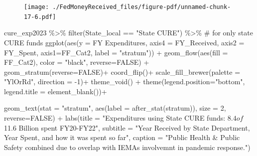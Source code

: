 \documentclass[
  letterpaper,
  DIV=11,
  numbers=noendperiod]{scrreport}
\newenvironment{Shaded}{\begin{snugshade}}{\end{snugshade}}
\newcommand{\AttributeTok}[1]{\textcolor[rgb]{0.40,0.45,0.13}{#1}}
\newcommand{\CommentTok}[1]{\textcolor[rgb]{0.37,0.37,0.37}{#1}}
\newcommand{\ConstantTok}[1]{\textcolor[rgb]{0.56,0.35,0.01}{#1}}
\newcommand{\DecValTok}[1]{\textcolor[rgb]{0.68,0.00,0.00}{#1}}
\newcommand{\FunctionTok}[1]{\textcolor[rgb]{0.28,0.35,0.67}{#1}}
\newcommand{\NormalTok}[1]{\textcolor[rgb]{0.00,0.23,0.31}{#1}}
\newcommand{\SpecialCharTok}[1]{\textcolor[rgb]{0.37,0.37,0.37}{#1}}
\newcommand{\StringTok}[1]{\textcolor[rgb]{0.13,0.47,0.30}{#1}}
\begin{document}
\begin{figure}[H]

{\centering \texttt{[image: ./FedMoneyReceived\_files/figure-pdf/unnamed-chunk-17-6.pdf]}

}

\end{figure}

\begin{Shaded}
\begin{Highlighting}[]
\NormalTok{cure\_exp2023 }\SpecialCharTok{\%\textgreater{}\%} 
  \FunctionTok{filter}\NormalTok{(State\_local }\SpecialCharTok{==} \StringTok{"State CURE"}\NormalTok{) }\SpecialCharTok{\%\textgreater{}\%} \CommentTok{\# for only state CURE funds}
  \FunctionTok{ggplot}\NormalTok{(}\FunctionTok{aes}\NormalTok{(}\AttributeTok{y =} \StringTok{\textasciigrave{}}\AttributeTok{FY Expenditures}\StringTok{\textasciigrave{}}\NormalTok{, }\AttributeTok{axis4 =}\NormalTok{ FY\_Received,  }
             \AttributeTok{axis2 =}\NormalTok{ FY\_Spent, }\AttributeTok{axis1=}\NormalTok{FF\_Cat2, }\AttributeTok{label =} \StringTok{"stratum"}\NormalTok{)) }\SpecialCharTok{+}
  \FunctionTok{geom\_flow}\NormalTok{(}\FunctionTok{aes}\NormalTok{(}\AttributeTok{fill =}\NormalTok{ FF\_Cat2), }\AttributeTok{color =} \StringTok{"black"}\NormalTok{, }\AttributeTok{reverse=}\ConstantTok{FALSE}\NormalTok{) }\SpecialCharTok{+}
  \FunctionTok{geom\_stratum}\NormalTok{(}\AttributeTok{reverse=}\ConstantTok{FALSE}\NormalTok{)}\SpecialCharTok{+}
  \FunctionTok{coord\_flip}\NormalTok{()}\SpecialCharTok{+}
  \FunctionTok{scale\_fill\_brewer}\NormalTok{(}\AttributeTok{palette =} \StringTok{"YlOrRd"}\NormalTok{, }\AttributeTok{direction =} \SpecialCharTok{{-}}\DecValTok{1}\NormalTok{)}\SpecialCharTok{+}
  \FunctionTok{theme\_void}\NormalTok{() }\SpecialCharTok{+} 
  \FunctionTok{theme}\NormalTok{(}\AttributeTok{legend.position=}\StringTok{"bottom"}\NormalTok{, }\AttributeTok{legend.title =} \FunctionTok{element\_blank}\NormalTok{())}\SpecialCharTok{+}
  
  \FunctionTok{geom\_text}\NormalTok{(}\AttributeTok{stat =} \StringTok{"stratum"}\NormalTok{, }\FunctionTok{aes}\NormalTok{(}\AttributeTok{label =} \FunctionTok{after\_stat}\NormalTok{(stratum)), }\AttributeTok{size =} \DecValTok{2}\NormalTok{, }\AttributeTok{reverse=}\ConstantTok{FALSE}\NormalTok{) }\SpecialCharTok{+}
  \FunctionTok{labs}\NormalTok{(}\AttributeTok{title =} \StringTok{"Expenditures using State CURE funds: $8.4 of $11.6 Billion spent FY20{-}FY22"}\NormalTok{, }
  \AttributeTok{subtitle =} \StringTok{"Year Received by State Department, Year Spent, and how it was spent so far"}\NormalTok{, }
  \AttributeTok{caption =} \StringTok{"Public Health \& Public Safety combined due to overlap with IEMA\textquotesingle{}s involvemnt in pandemic response."}\NormalTok{)}
\end{Highlighting}
\end{Shaded}
\end{document}
